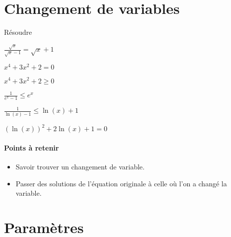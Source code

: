 \documentclass[a4paper, 11pt]{article}
\newcommand{\subscript}[2]{$#1 _ #2$}
\begin{document}
\section{Changement de variables}
\begin{exercice}
Résoudre

\begin{enumerate}[label=(\subscript{CV}{{\arabic*}}) : $\,$]
\hspace{1cm}
\begin{minipage}[t]{0.33\textwidth}
    \item $\frac{\sqrt{x}}{\sqrt{x}-1}=\sqrt{x}+1$\\
    \item $x^4+3x^2+2=0$
\end{minipage}
\begin{minipage}[t]{0.33\textwidth}
    \item $x^4+3x^2+2\geq 0$\\
    \item $\frac{1}{e^x-1}\leq e^x$
\end{minipage}
\begin{minipage}[t]{0.3\textwidth}
    \item$\frac{1}{\ln(x)-1}\leq \ln(x)+1$\\
    \item $(\ln(x))^2+2\ln(x)+1=0$
\end{minipage}
\end{enumerate}

\paragraph{Points à retenir}
\begin{itemize}
    \item Savoir trouver un changement de variable.
    \item Passer des solutions de l'équation originale à celle où l'on a changé la variable. 
\end{itemize}
\end{exercice}



\section{Paramètres}
\end{document}
